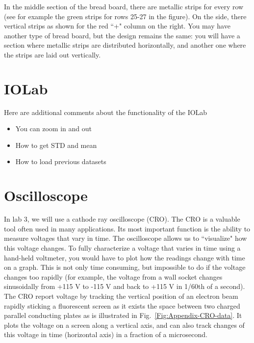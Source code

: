 \documentclass[12pt]{report}
\def\cesar#1{{\color{blue}[#1]}}
\begin{document}
\begin{appendix}
In the middle section of the bread board, there are metallic strips for every row (see for example the green strips for rows 25-27 in the figure).
On the side, there vertical strips as shown for the red ``+" column on the right.
You may have another type of bread board, but the design remains the same: you will have a section where metallic strips are distributed horizontally,
and another one where the strips are laid out vertically.



\section{IOLab}
Here are additional comments about the functionality of the IOLab

\begin{itemize}
\item You can zoom in and out
\item How to get STD and mean
\item How to load previous datasets
\end{itemize}

\section{Oscilloscope}
In lab 3, we will use a cathode ray oscilloscope (CRO). The CRO is a valuable tool often used in many applications. Its most important function is the
ability to measure voltages that vary in time. The oscilloscope allows us to ``visualize" how this
voltage changes. To fully characterize a voltage that varies in time using a hand-held voltmeter,
you would have to plot how the readings change with time on a graph. This is not only time
consuming, but impossible to do if the voltage changes too rapidly (for example, the voltage
from a wall socket changes sinusoidally from +115 V to -115 V and back to +115 V in 1/60th of
a second). The CRO report voltage by tracking the vertical position of an electron beam rapidly
sticking a fluorescent screen as it exists the space between two charged parallel conducting
plates as is illustrated in Fig.~\ref{Fig:Appendix-CRO-data}. It plots the voltage on a screen along a vertical axis, and can
also track changes of this voltage in time (horizontal axis) in a fraction of a microsecond.



\end{appendix}
\end{document}
